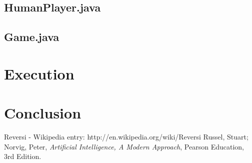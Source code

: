 \documentclass[12pt]{article}
\begin{document}
\subsection{HumanPlayer.java}
\subsection{Game.java}
\section{Execution}
\section{Conclusion}
\begin{thebibliography}{9}
	Reversi - Wikipedia entry: http://en.wikipedia.org/wiki/Reversi
	 Russel, Stuart; Norvig, Peter, \emph{Artificial Intelligence, A Modern Approach}, Pearson Education, 3rd Edition.
\end{thebibliography}
\end{document}
